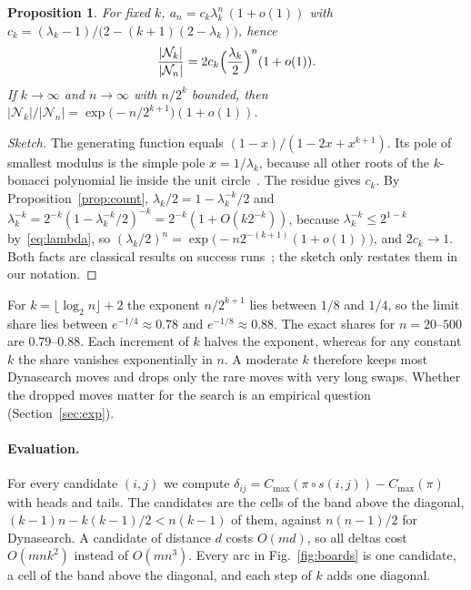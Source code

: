 \documentclass[letterpaper]{article} %
\newtheorem{proposition}{Proposition}
\theoremstyle{definition}
\newcommand{\N}{\mathcal{N}}
\begin{document}
\begin{proposition}\label{prop:share}
For fixed $k$, $a_n=c_k\lambda_k^n\,(1+o(1))$ with
$c_k=(\lambda_k-1)/\bigl(2-(k+1)(2-\lambda_k)\bigr)$, hence
\begin{equation}\label{eq:share}
\frac{|\N_k|}{|\N_n|}=2c_k\Bigl(\frac{\lambda_k}{2}\Bigr)^{n}(1+o(1)).
\end{equation}
If $k\to\infty$ and $n\to\infty$ with $n/2^k$ bounded, then
$|\N_k|/|\N_n|=\exp\bigl(-n/2^{k+1}\bigr)(1+o(1))$.
\end{proposition}
\begin{proof}[Sketch]
The generating function equals $(1-x)/(1-2x+x^{k+1})$. Its pole of
smallest modulus is the simple pole $x=1/\lambda_k$, because all other
roots of the $k$-bonacci polynomial lie inside the unit
circle~\cite{miles1960}. The residue gives $c_k$. By
Proposition~\ref{prop:count}, $\lambda_k/2=1-\lambda_k^{-k}/2$ and
$\lambda_k^{-k}=2^{-k}(1-\lambda_k^{-k}/2)^{-k}=2^{-k}(1+O(k2^{-k}))$,
because $\lambda_k^{-k}\leq 2^{1-k}$ by~\eqref{eq:lambda}, so
$(\lambda_k/2)^n=\exp\bigl(-n2^{-(k+1)}(1+o(1))\bigr)$, and $2c_k\to 1$.
Both facts are classical results on success
runs~\cite{feller1968,gordon1986}; the sketch only restates them in our
notation.
\end{proof}

For $k=\lfloor\log_2 n\rfloor+2$ the exponent $n/2^{k+1}$ lies between
$1/8$ and $1/4$, so the limit share lies between $e^{-1/4}\approx 0.78$
and $e^{-1/8}\approx 0.88$. The exact shares for $n=20$--$500$ are
$0.79$--$0.88$. Each increment of $k$ halves the exponent, whereas for
any constant $k$ the share vanishes exponentially in $n$. A moderate $k$
therefore keeps most Dynasearch moves and drops only the rare moves with
very long swaps. Whether the dropped moves matter for the search is an
empirical question (Section~\ref{sec:exp}).


\paragraph{Evaluation.} For every candidate $(i,j)$ we compute
$\delta_{ij}=C_{\max}(\pi\circ s(i,j))-C_{\max}(\pi)$ with heads and
tails. The candidates are the cells of the band above the diagonal,
$(k-1)n-k(k-1)/2<n(k-1)$ of them, against $n(n-1)/2$ for Dynasearch. A
candidate of distance $d$ costs $O(md)$, so all deltas cost $O(mnk^2)$
instead of $O(mn^3)$. Every arc in Fig.~\ref{fig:boards} is one candidate, a cell of the
band above the diagonal, and each step of $k$ adds one diagonal.
\end{document}
